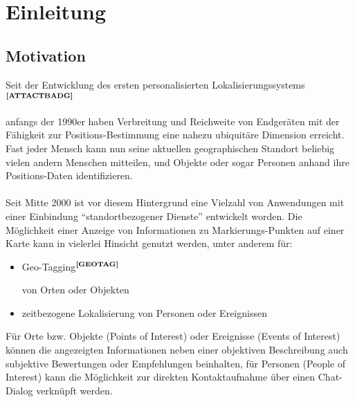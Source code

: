 %
%
\section{Einleitung}


\subsection{Motivation}

Seit der Entwicklung des ersten personalisierten Lokalisierungssystems$^{\textbf{\ref{ATTACTBADG}}}$%
\addtocounter{footnote}{1}%
anfangs der 1990er haben Verbreitung und Reichweite von Endgeräten mit der Fähigkeit zur Positions-Bestimmung eine nahezu ubiquitäre Dimension erreicht. Fast jeder Mensch kann nun seine aktuellen geographischen Standort beliebig vielen andern Menschen mitteilen, und Objekte oder sogar Personen anhand ihre Positions-Daten identifizieren. \\ \\
Seit Mitte 2000 ist vor diesem Hintergrund eine Vielzahl von Anwendungen mit einer Einbindung "`standortbezogener Dienste"' entwickelt worden. Die Möglichkeit einer Anzeige von Informationen zu Markierungs-Punkten auf einer Karte kann in vielerlei Hinsicht genutzt werden, unter anderem für:
\begin{itemize}
  \item Geo-Tagging$^{\textbf{\ref{GEOTAG}}}$
\addtocounter{footnote}{1}%
%
von Orten oder Objekten
  \item zeitbezogene Lokalisierung von Personen oder Ereignissen
\end{itemize}
\vspace{1ex}
Für Orte bzw. Objekte (Points of Interest) oder Ereignisse (Events of Interest) können die angezeigten Informationen neben einer objektiven Beschreibung auch subjektive Bewertungen oder Empfehlungen beinhalten, für Personen (People of Interest) kann die Möglichkeit zur direkten Kontaktaufnahme über einen Chat-Dialog verknüpft werden.\\ \\

